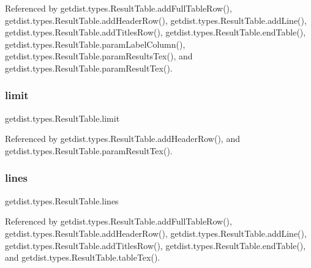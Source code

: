 Referenced by getdist.\+types.\+Result\+Table.\+add\+Full\+Table\+Row(), getdist.\+types.\+Result\+Table.\+add\+Header\+Row(), getdist.\+types.\+Result\+Table.\+add\+Line(), getdist.\+types.\+Result\+Table.\+add\+Titles\+Row(), getdist.\+types.\+Result\+Table.\+end\+Table(), getdist.\+types.\+Result\+Table.\+param\+Label\+Column(), getdist.\+types.\+Result\+Table.\+param\+Results\+Tex(), and getdist.\+types.\+Result\+Table.\+param\+Result\+Tex().

\mbox{\label{classgetdist_1_1types_1_1ResultTable_ae3f612b398b5fe2ece1d5e7904c3ae9f}} 
\subsubsection{\texorpdfstring{limit}{limit}}
{\footnotesize\ttfamily getdist.\+types.\+Result\+Table.\+limit}



Referenced by getdist.\+types.\+Result\+Table.\+add\+Header\+Row(), and getdist.\+types.\+Result\+Table.\+param\+Result\+Tex().

\mbox{\label{classgetdist_1_1types_1_1ResultTable_a0ee609726613350f31ccf00fbb7dca3a}} 
\subsubsection{\texorpdfstring{lines}{lines}}
{\footnotesize\ttfamily getdist.\+types.\+Result\+Table.\+lines}



Referenced by getdist.\+types.\+Result\+Table.\+add\+Full\+Table\+Row(), getdist.\+types.\+Result\+Table.\+add\+Header\+Row(), getdist.\+types.\+Result\+Table.\+add\+Line(), getdist.\+types.\+Result\+Table.\+add\+Titles\+Row(), getdist.\+types.\+Result\+Table.\+end\+Table(), and getdist.\+types.\+Result\+Table.\+table\+Tex().

\mbox{\label{classgetdist_1_1types_1_1ResultTable_a020be5a94df368053d01744a206bfaa0}} 
